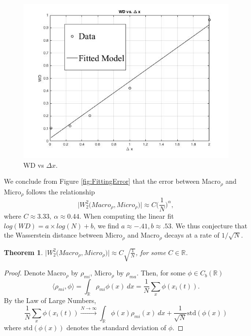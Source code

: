 \documentclass[10pt]{article}
\newtheorem{theorem}{Theorem}
\begin{document}
\begin{figure}[H]
\begin{center}
\includegraphics[scale = .4]{WDVSDX.jpg}
\end{center}
\caption{WD vs $\Delta x$.}
\end{figure}

\noindent We conclude from Figure \ref{fig:FittingError}  that the error between Macro$_\rho$ and Micro$_\rho$ follows the relationship 
\begin{equation*}
\Big|W^2_2\Big(Macro_\rho, Micro_\rho\Big)\Big| \approx C\Big({\frac{1}{N}}\Big)^{\alpha},
\end{equation*}
 where $C \approx 3.33, \ \alpha \approx 0.44 $. When computing the linear fit  $log(WD) = a\times log(N) + b$, we find $a \approx -.41,  b \approx .53$. We thus conjecture that the Wasserstein distance between Micro$_\rho$ and Macro$_\rho$ decays at a rate of $1/\sqrt{N}$.
\begin{theorem}
$\Big|W^2_2\Big(Macro_\rho, Micro_\rho\Big)\Big| \approx C\sqrt{\frac{1}{N}}$, for some $C \in \mathbb{R}$.
\end{theorem}
\begin{proof}
Denote Macro$_\rho$ by $\rho_{mi}$, Micro$_\rho$ by $\rho_{ma}$. Then, for some $\phi \in C_b(\mathbb{R})$
\begin{equation*}
\langle \rho_{mi}, \phi \rangle = \int_{\mathbb{R}} \rho_{mi} \phi(x) \ dx = \frac{1}{N}\sum_x \phi(x_i(t)).
\end{equation*}
By the Law of Large Numbers, 
\begin{equation*}
\frac{1}{N}\sum_x \phi(x_i(t)) \xrightarrow{N \rightarrow \infty} \int_{\mathbb{R}} \phi(x)\rho_{mi}(x) \ dx + \frac{1}{\sqrt{N}}\text{std}(\phi(x))
\end{equation*}
where $\text{std}(\phi(x))$ denotes the standard deviation of $\phi$.
\end{proof}
\end{document}
